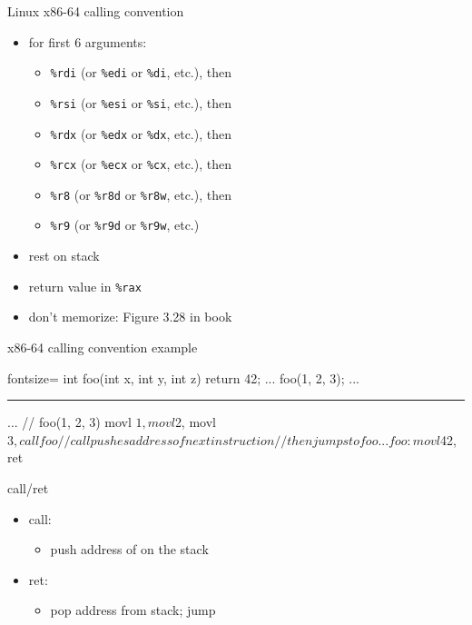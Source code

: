 \begin{frame}{Linux x86-64 calling convention}
    \begin{itemize}
    \item {} for first 6 arguments:
    \begin{itemize}
    \item {\tt \%rdi} (or {\tt \%edi} or {\tt \%di}, etc.), then
    \item {\tt \%rsi} (or {\tt \%esi} or {\tt \%si}, etc.), then
    \item {\tt \%rdx} (or {\tt \%edx} or {\tt \%dx}, etc.), then
    \item {\tt \%rcx} (or {\tt \%ecx} or {\tt \%cx}, etc.), then
    \item {\tt \%r8} (or {\tt \%r8d} or {\tt \%r8w}, etc.), then
    \item {\tt \%r9} (or {\tt \%r9d} or {\tt \%r9w}, etc.)
    \end{itemize}
    \item rest on stack
    \item return value in {\tt \%rax}
    \item don't memorize: Figure 3.28 in book
    \end{itemize}
\end{frame}


\begin{frame}[fragile,label=x8664CCExample]{x86-64 calling convention example}
\begin{ccodeNL*}{fontsize=\small}
int foo(int x, int y, int z) { return 42; }
...
    foo(1, 2, 3);
...
\end{ccodeNL*}
\hrule
\begin{asmcodeS}
...
    // foo(1, 2, 3)
    movl $1, %
    movl $2, %
    movl $3, %
    call foo  // call pushes address of next instruction
              // then jumps to foo
...
foo: 
    movl $42, %
    ret
\end{asmcodeS}
\end{frame}

\begin{frame}[fragile,label=stackFrame]{call/ret}
\begin{itemize}
\item call:
    \begin{itemize}
    \item push address of  on the stack
    \end{itemize}
\item ret:
    \begin{itemize}
    \item pop address from stack; jump
    \end{itemize}
\end{itemize}
\end{frame}

